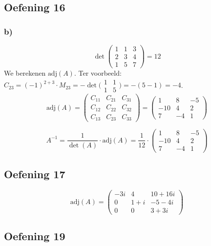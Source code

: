 \documentclass[lineaire_algebra_oplossingen.tex]{subfiles}
\begin{document}
\subsection{Oefening 16}
\subsubsection*{b)}
\[
\det
\begin{pmatrix}
1 & 1 & 3\\
2 & 3 & 4\\
1 & 5 & 7
\end{pmatrix}
= 12
\]
We berekenen $\text{adj}(A)$. Ter voorbeeld: $C_{23}
= (-1)^{2+3} \cdot M_{23}
= -\det \bigl( \begin{smallmatrix}1 & 1 \\ 1 & 5\end{smallmatrix} \bigr)
= -(5-1) = -4$.
\[
\text{adj}(A) =
\begin{pmatrix}
C_{11} & C_{21} & C_{31}\\
C_{12} & C_{22} & C_{32}\\
C_{13} & C_{23} & C_{33}
\end{pmatrix}
= 
\begin{pmatrix}
  1 &  8 & -5 \\
-10 &  4 &  2 \\
  7 & -4 &  1
\end{pmatrix}
\]

\[
A^{-1} = \frac{1}{\det(A)} \cdot \text{adj}(A)
= \frac{1}{12} \cdot
\begin{pmatrix}
  1 &  8 & -5 \\
-10 &  4 &  2 \\
  7 & -4 &  1
\end{pmatrix}
\]

\subsection{Oefening 17}
\[
\text{adj}(A)=
\begin{pmatrix}
-3i & 4 & 10+16i\\
0 & 1+i & -5-4i\\
0 & 0 & 3+3i
\end{pmatrix}
\]

\subsection{Oefening 19}
\end{document}
